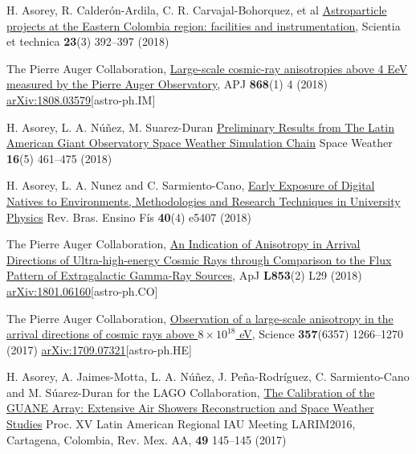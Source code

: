 \begin{etaremune}
\item {}H. Asorey, R. Calderón-Ardila, C. R. Carvajal-Bohorquez, et al \href{http://dx.doi.org/10.22517/23447214.17561}{Astroparticle projects at the Eastern Colombia region: facilities and instrumentation}, Scientia et technica {\textbf{23}}(3) 392--397 (2018)

\item {}The Pierre Auger Collaboration, \href{}{{Large-scale cosmic-ray anisotropies above 4 EeV measured by the Pierre Auger Observatory}}, APJ {\textbf{868}}(1) 4 (2018) \href{https://arxiv.org/abs/1808.03579}{arXiv:1808.03579}[astro-ph.IM]

\item {}H. Asorey, L. A. Núñez, M. Suarez-Duran \href{https://doi.org/10.1002/2017SW001774}{{Preliminary Results from The Latin American Giant Observatory Space Weather Simulation Chain}} Space Weather {\textbf{16}}(5) 461--475 (2018) %

\item {} H. Asorey, L. A. Nunez and C. Sarmiento-Cano, \href{http://dx.doi.org/10.1590/1806-9126-rbef-2018-0092}{{Early Exposure of Digital Natives to Environments, Methodologies and Research Techniques in University Physics}} Rev.
Bras.
Ensino Fís {\textbf{40}}(4) e5407 (2018) %

\item {}The Pierre Auger Collaboration, \href{https://doi.org/10.3847/2041-8213/aaa66d}{{An Indication of Anisotropy in Arrival Directions of Ultra-high-energy Cosmic Rays through Comparison to the Flux Pattern of Extragalactic Gamma-Ray Sources}}, ApJ {\textbf{L853}}(2) L29 (2018) \href{https://arxiv.org/abs/1801.06160}{arXiv:1801.06160}[astro-ph.CO]

\item {}The Pierre Auger Collaboration, \href{https://doi.org/10.1126/science.aan4338}{{Observation of a large-scale anisotropy in the arrival directions of cosmic rays above $8\times 10^{18}$ eV}}, Science {\textbf{357}}(6357) 1266--1270 (2017) \href{https://arxiv.org/abs/1709.07321}{arXiv:1709.07321}[astro-ph.HE]

\item {} H. Asorey, A. Jaimes-Motta, L. A. Núñez, J. Peña-Rodríguez, C. Sarmiento-Cano and M. Súarez-Duran for the LAGO Collaboration, \href{http://www.astroscu.unam.mx/rmaa/RMxAC..49/PDF/RMxAC..49\_poster3.pdf}{{The Calibration of the GUANE Array: Extensive Air Showers Reconstruction and Space Weather Studies}} \en Proc.
XV Latin American Regional IAU Meeting LARIM2016, Cartagena, Colombia, Rev.
Mex.
AA, {\textbf{49}} 145--145 (2017)


\end{etaremune}

